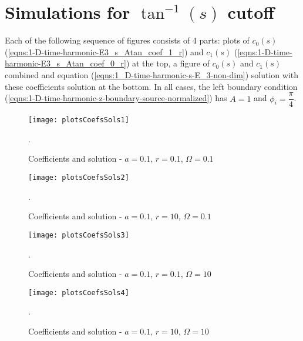 \documentclass[12pt,twoside]{report}
\begin{document}
\newpage

\section{Simulations for $\tan^{-1}(s)$ cutoff}

Each of the following sequence of figures consists of 4 parts: plots of $c_0(s)$ (\ref{eqns:1-D-time-harmonic-E3_s_Atan_coef_1_r}) and $c_1(s)$ (\ref{eqns:1-D-time-harmonic-E3_s_Atan_coef_0_r}) at the top, a figure of $c_0(s)$ and $c_1(s)$ combined and equation (\ref{eqns:1_D-time-harmonic-s-E_3-non-dim}) solution with these coefficients solution at the bottom. In all cases, the left boundary condition (\ref{eqns:1-D-time-harmonic-z-boundary-source-normalized}) has $A=1$ and $\phi_i=\dfrac{\pi}{4}$.  

\begin{figure}[!htb] 
\begin{center}
\texttt{[image: plotsCoefsSols1]}
\end{center}
\caption {Coefficients and solution - $a = 0.1$, $r = 0.1$, $\Omega = 0.1$}.

\label{fig:atanCoefsPlots1}
\end{figure}

\begin{figure} 
\begin{center}
\texttt{[image: plotsCoefsSols2]}
\end{center}
\caption {Coefficients and solution - $a = 0.1$, $r = 10$, $\Omega = 0.1$}.

\label{fig:atanCoefsPlots2}
\end{figure}

\begin{figure} 
\begin{center}
\texttt{[image: plotsCoefsSols3]}
\end{center}
\caption {Coefficients and solution - $a = 0.1$, $r = 0.1$, $\Omega = 10$}.

\label{fig:atanCoefsPlots3}
\end{figure}

\begin{figure} 
\begin{center}
\texttt{[image: plotsCoefsSols4]}
\end{center}
\caption {Coefficients and solution - $a = 0.1$, $r = 10$, $\Omega = 10$}.

\label{fig:atanCoefsPlots4}
\end{figure}
\end{document}
